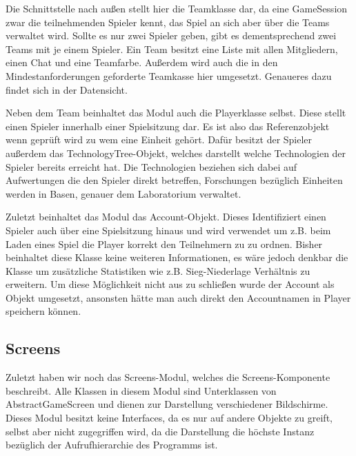 \documentclass[fontsize=12pt,paper=a4,twoside]{scrartcl}
\begin{document}
Die Schnittstelle nach außen stellt hier die Teamklasse dar, da eine GameSession zwar die teilnehmenden Spieler kennt, das Spiel an sich aber über die Teams verwaltet wird. Sollte es nur zwei Spieler geben, gibt es dementsprechend zwei Teams mit je einem Spieler. Ein Team besitzt eine Liste mit allen Mitgliedern, einen Chat und eine Teamfarbe. Außerdem wird auch die in den Mindestanforderungen geforderte Teamkasse hier umgesetzt. Genaueres dazu findet sich in der Datensicht. 

Neben dem Team beinhaltet das Modul auch die Playerklasse selbst. Diese stellt einen Spieler innerhalb einer Spielsitzung dar. Es ist also das Referenzobjekt wenn geprüft wird zu wem eine Einheit gehört. Dafür besitzt der Spieler außerdem das TechnologyTree-Objekt, welches darstellt welche Technologien der Spieler bereits erreicht hat. Die Technologien beziehen sich dabei auf Aufwertungen die den Spieler direkt betreffen, Forschungen bezüglich Einheiten werden in Basen, genauer dem Laboratorium verwaltet.

Zuletzt beinhaltet das Modul das Account-Objekt. Dieses Identifiziert einen Spieler auch über eine Spielsitzung hinaus und wird verwendet um z.B. beim Laden eines Spiel die Player korrekt den Teilnehmern zu zu ordnen. Bisher beinhaltet diese Klasse keine weiteren Informationen, es wäre jedoch denkbar die Klasse um zusätzliche Statistiken wie z.B. Sieg-Niederlage Verhältnis zu erweitern. Um diese Möglichkeit nicht aus zu schließen wurde der Account als Objekt umgesetzt, ansonsten hätte man auch direkt den Accountnamen in Player speichern können.

\subsection{Screens}
Zuletzt haben wir noch das Screens-Modul, welches die Screens-Komponente beschreibt. Alle Klassen in diesem Modul sind Unterklassen von AbstractGameScreen und dienen zur Darstellung verschiedener Bildschirme. Dieses Modul besitzt keine Interfaces, da es nur auf andere Objekte zu greift, selbst aber nicht zugegriffen wird, da die Darstellung die höchste Instanz bezüglich der Aufrufhierarchie des Programms ist.
\end{document}
